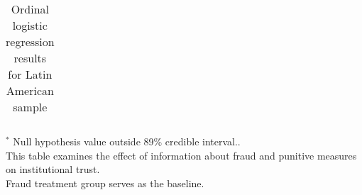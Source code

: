 \begin{table}[h]
\begin{center}
\begin{threeparttable}
\begin{tabular}{l c c c c c c}
\hline
\end{tabular}
\begin{tablenotes}[flushleft]
\scriptsize{$^*$ Null hypothesis value outside 89\% credible interval..  \\
This table examines the effect of information about fraud
                      and punitive measures on institutional trust. \\
Fraud treatment group serves as the baseline.}
\end{tablenotes}
\end{threeparttable}
\caption{Ordinal logistic regression results for Latin American sample}
\label{table:coefficients}
\end{center}
\end{table}
